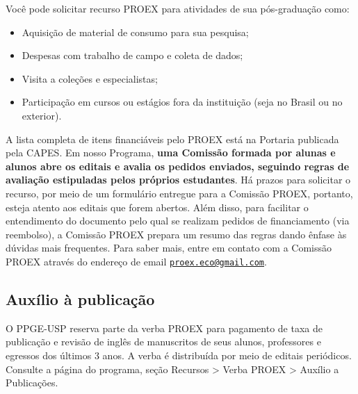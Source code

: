 \documentclass[twoside a4paper 12pt]{report}
\begin{document}
Você pode solicitar recurso PROEX para atividades de sua pós-graduação como:

\begin{itemize}
\item Aquisição de material de consumo para sua pesquisa;
\item Despesas com trabalho de campo e coleta de dados;
\item Visita a coleções e especialistas;
\item Participação em cursos ou estágios fora da instituição (seja no Brasil ou no exterior).
\end{itemize}

A lista completa de itens financiáveis pelo PROEX está na Portaria publicada pela CAPES. Em nosso Programa, \textbf{uma Comissão formada por alunas e alunos abre os editais e avalia os pedidos enviados, seguindo regras de avaliação estipuladas pelos próprios estudantes}. Há prazos para solicitar o recurso, por meio de um formulário entregue para a Comissão PROEX, portanto, esteja atento aos editais que forem abertos. Além disso, para facilitar o entendimento do documento pelo qual se realizam pedidos de financiamento (via reembolso), a Comissão PROEX prepara um resumo das regras dando ênfase às dúvidas mais frequentes. Para saber mais, entre em contato com a Comissão PROEX através do endereço de email \href{mailto:proex.eco@gmail.com}{\nolinkurl{proex.eco@gmail.com}}.

\subsection{Auxílio à publicação}

O PPGE-USP reserva parte da verba PROEX para pagamento de taxa de publicação e revisão de inglês de manuscritos de seus alunos, professores e egressos dos últimos 3 anos. A verba é distribuída por meio de editais periódicos. Consulte a página do programa, seção Recursos \textgreater{} Verba PROEX \textgreater{} Auxílio a Publicações.



\end{document}
